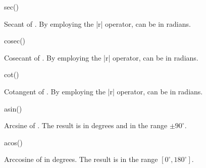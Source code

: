 \begin{math-function}{sec()}
\mathcommand

	Secant of . By employing the |r| operator,  can be in 
	radians.

\begin{codeexample}[]
 \pgfmathresult
\end{codeexample}

\end{math-function}

\begin{math-function}{cosec()}
\mathcommand

	Cosecant of . By employing the |r| operator,  can be in 
	radians.
	
\begin{codeexample}[]
 \pgfmathresult
\end{codeexample}

\end{math-function}

\begin{math-function}{cot()}
\mathcommand

	Cotangent of . By employing the |r| operator,  can be in 
	radians.
	
\begin{codeexample}[]
 \pgfmathresult
\end{codeexample}

\end{math-function}

\begin{math-function}{asin()}
\mathcommand

	Arcsine of . The result is in degrees and in the range $\pm90^\circ$.

\begin{codeexample}[]
 \pgfmathresult
\end{codeexample}

\end{math-function}

\begin{math-function}{acos()}
\mathcommand

	Arccosine of  in degrees. The result is in the range $[0^\circ,180^\circ]$.

\begin{codeexample}[]
 \pgfmathresult
\end{codeexample}

\end{math-function}

